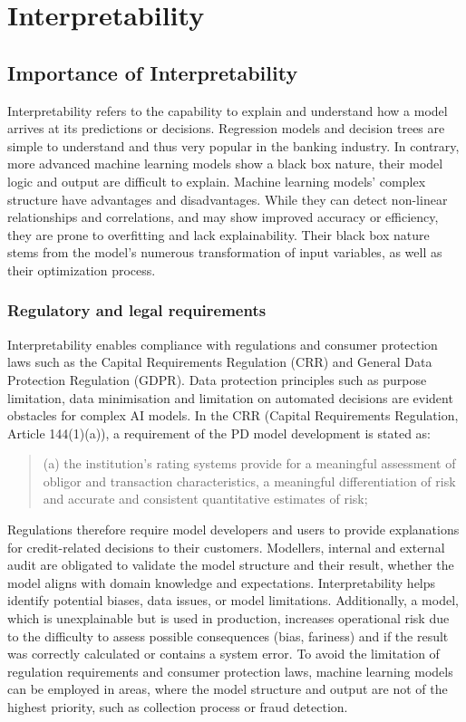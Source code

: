\chapter{Interpretability}

\section{Importance of Interpretability}
Interpretability refers to the capability to explain and understand how a model arrives at its predictions or decisions. Regression models and decision trees are simple to understand and thus very popular in the banking industry. In contrary, more advanced machine learning models show a black box nature, their model logic and output are difficult to explain. Machine learning models' complex structure have advantages and disadvantages. While they can detect non-linear relationships and correlations, and may show improved accuracy or efficiency, they are prone to overfitting and lack explainability. Their black box nature stems from the model's numerous transformation of input variables, as well as their optimization process. 

\subsection{Regulatory and legal requirements}

Interpretability enables compliance with regulations and consumer protection laws such as the Capital Requirements Regulation (CRR) and General Data Protection Regulation (GDPR). Data protection principles such as purpose limitation, data minimisation and limitation on automated decisions are evident obstacles for complex AI models. In the CRR (Capital Requirements Regulation, Article 144(1)(a)), a requirement of the PD model development is stated as:

\begin{quote}

(a) the institution's rating systems provide for a meaningful assessment of obligor and transaction characteristics, a meaningful differentiation of risk and accurate and consistent quantitative estimates of risk;

\end{quote}

Regulations therefore require model developers and users to provide explanations for credit-related decisions to their customers. Modellers, internal and external audit are obligated to validate the model structure and their result, whether the model aligns with domain knowledge and expectations. Interpretability helps identify potential biases, data issues, or model limitations. Additionally, a model, which is unexplainable but is used in production, increases operational risk due to the difficulty to assess possible consequences (bias, fariness) and if the result was correctly calculated or contains a system error. To avoid the limitation of regulation requirements and consumer protection laws, machine learning models can be employed in areas, where the model structure and output are not of the highest priority, such as collection process or fraud detection. 

